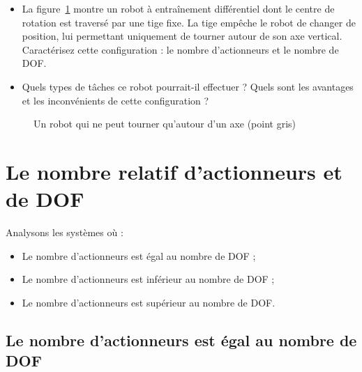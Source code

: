 {\begin{framed}
\begin{itemize}
\item La figure~\ref{fig.rot-dof} montre un robot à entraînement différentiel dont le centre de rotation est traversé par une tige fixe. La tige empêche le robot de changer de position, lui permettant uniquement de tourner autour de son axe vertical. Caractérisez cette configuration : le nombre d'actionneurs et le nombre de DOF.
\item Quels types de tâches ce robot pourrait-il effectuer ? Quels sont les avantages et les inconvénients de cette configuration ?
\end{itemize}
\end{framed}

\begin{figure}
\begin{center}
\end{center}
\caption{Un robot qui ne peut tourner qu'autour d'un axe (point gris)}\label{fig.rot-dof}
\end{figure}

\section{Le nombre relatif d'actionneurs et de DOF}\label{s.num-actuators}

Analysons les systèmes où :
\begin{itemize}
\item Le nombre d'actionneurs est égal au nombre de DOF ;
\item Le nombre d'actionneurs est inférieur au nombre de DOF ;
\item Le nombre d'actionneurs est supérieur au nombre de DOF.
\end{itemize}

\subsection*{Le nombre d'actionneurs est égal au nombre de DOF}

}
